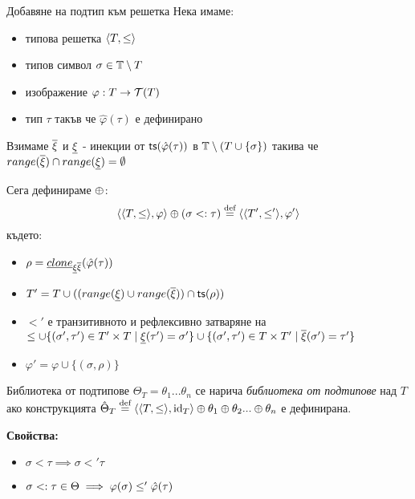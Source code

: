 \documentclass[9pt]{beamer}
\begin{document}
  \begin{frame}{Добавяне на подтип към решетка}
    Нека имаме:
    \begin{itemize}
        \item типова решетка $\langle  T,  \leq  \rangle$
        \item типов символ $\sigma \in \mathbb{T} \setminus T$
        \item изображение $\varphi : T \rightarrow \mathcal{T}( T )$
        \item тип $\tau$ такъв че $\hat{\varphi}(\tau)$ е дефинирано
    \end{itemize}
    Взимаме $\overline{\xi}$ и $\underline{\xi}$ - инекции от
    $\mathsf{ts}(\hat{\varphi}(\tau))$ в $\mathbb{T} \setminus (T \cup \{ \sigma \})$ такива че
    $range(\overline{\xi}) \cap range(\underline{\xi}) = \emptyset$

    Сега дефинираме $\oplus$:
        \[ \langle \langle  T,  \leq  \rangle, \varphi \rangle
            \oplus (\sigma <: \tau)
            \overset{\text{\scriptsize def}}{=}
            \langle \langle  T',  \leq'  \rangle, \varphi' \rangle
        \] където:
    \begin{itemize}
        \item $\rho = \underline{clone}_{\underline{\xi} \overline{\xi}}(\hat{\varphi}(\tau))$
        \item $T' = T \cup ((range(\underline{\xi}) \cup range(\overline{\xi})) \cap \mathsf{ts}(\rho))$
        \item $\less'$ е транзитивното и рефлексивно затваряне на
            $\leq \cup \{ (\sigma', \tau') \in T' \times T \mid \underline{\xi}(\tau') = \sigma' \}
                   \cup \{ (\sigma', \tau') \in T \times T' \mid \overline{\xi}(\sigma') = \tau' \}$
        \item $\varphi' = \varphi \cup \{ (\sigma, \rho) \}$
    \end{itemize}
  \end{frame}

  \begin{frame}{Библиотека от подтипове}
    $\Theta_T = \theta_1 ... \theta_n$ се нарича \emph{библиотека от подтипове} над $T$
    ако конструкцията $\hat{\Theta}_T \overset{\text{\scriptsize def}}{=} \langle \langle  T,  \leq  \rangle, \mathrm{id}_T \rangle \oplus \theta_1 \oplus \theta_2 ... \oplus \theta_n$
    е дефинирана.

    \textbf{Свойства:}
    \begin{itemize}
        \item $\sigma \less \tau \implies \sigma \less' \tau$
        \item $\sigma <: \tau \in \Theta \implies \varphi(\sigma) \leq' \hat{\varphi}(\tau)$
    \end{itemize}
  \end{frame}
\end{document}
